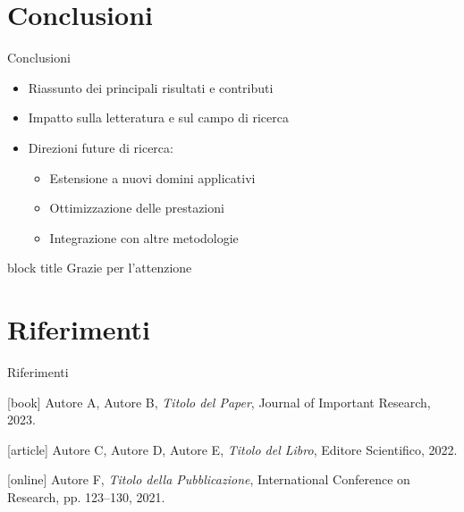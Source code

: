 \documentclass[aspectratio=169,11pt]{beamer}
\begin{document}
\section*{Conclusioni}
\begin{frame}{Conclusioni}
  \begin{itemize}
    \item Riassunto dei principali risultati e contributi
    \item Impatto sulla letteratura e sul campo di ricerca
    \item Direzioni future di ricerca:
      \begin{itemize}
        \item Estensione a nuovi domini applicativi
        \item Ottimizzazione delle prestazioni
        \item Integrazione con altre metodologie
      \end{itemize}
  \end{itemize}
  
  \vspace{1cm}
  \begin{center}
    \begin{beamercolorbox}[rounded=true,shadow=true,wd=0.7\textwidth]{block title}
      \centering
      \LARGE Grazie per l'attenzione
    \end{beamercolorbox}
  \end{center}
\end{frame}

\section*{Riferimenti}
\begin{frame}[allowframebreaks]{Riferimenti}
  \begin{thebibliography}{9}
    [book]
    Autore A, Autore B,
    \textit{Titolo del Paper},
    Journal of Important Research, 2023.
    
    [article]
    Autore C, Autore D, Autore E,
    \textit{Titolo del Libro},
    Editore Scientifico, 2022.
    
    [online]
    Autore F,
    \textit{Titolo della Pubblicazione},
    International Conference on Research, pp. 123--130, 2021.
  \end{thebibliography}
\end{frame}
\end{document}
